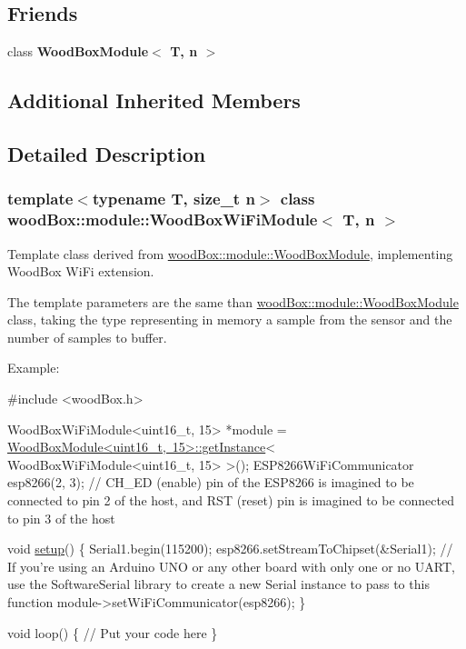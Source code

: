 \subsection*{Friends}
\begin{DoxyCompactItemize}
\item 
\mbox{\label{classwood_box_1_1module_1_1_wood_box_wi_fi_module_a63a1b80c5bfd6525d93f1b3dc9dab20b}} 
class {\bfseries Wood\+Box\+Module$<$ T, n $>$}
\end{DoxyCompactItemize}
\subsection*{Additional Inherited Members}


\subsection{Detailed Description}
\subsubsection*{template$<$typename T, size\+\_\+t n$>$\newline
class wood\+Box\+::module\+::\+Wood\+Box\+Wi\+Fi\+Module$<$ T, n $>$}

Template class derived from \mbox{\hyperlink{classwood_box_1_1module_1_1_wood_box_module}{wood\+Box\+::module\+::\+Wood\+Box\+Module}}, implementing Wood\+Box Wi\+Fi extension.

The template parameters are the same than \mbox{\hyperlink{classwood_box_1_1module_1_1_wood_box_module}{wood\+Box\+::module\+::\+Wood\+Box\+Module}} class, taking the type representing in memory a sample from the sensor and the number of samples to buffer.

Example\+:


\begin{DoxyCode}
\textcolor{preprocessor}{#include <woodBox.h>}

WoodBoxWiFiModule<uint16\_t, 15> *module = 
      \mbox{\hyperlink{classwood_box_1_1module_1_1_wood_box_module_a3f13bd3a6318ddf2a7db84f86b198a49}{WoodBoxModule<uint16\_t, 15>::getInstance}}<
      WoodBoxWiFiModule<uint16\_t, 15> >();
ESP8266WiFiCommunicator esp8266(2, 3); \textcolor{comment}{// CH\_ED (enable) pin of the ESP8266 is imagined to be connected to
       pin 2 of the host, and RST (reset) pin is imagined to be connected to pin 3 of the host}

\textcolor{keywordtype}{void} \mbox{\hyperlink{classwood_box_1_1module_1_1_wood_box_module_a610b2339bd0ff26d2cde59d2006a4aed}{setup}}() \{
  Serial1.begin(115200);
  esp8266.setStreamToChipset(&Serial1); \textcolor{comment}{// If you're using an Arduino UNO or any other board with only one
       or no UART, use the SoftwareSerial library to create a new Serial instance to pass to this function}
  module->setWiFiCommunicator(esp8266);
\}

\textcolor{keywordtype}{void} loop() \{
  \textcolor{comment}{// Put your code here}
\}
\end{DoxyCode}
 

